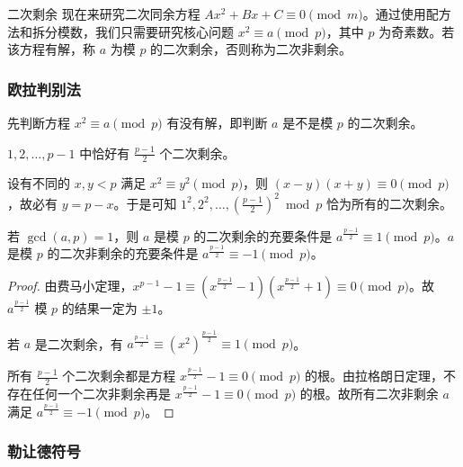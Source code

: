 \documentclass[../main.tex]{subfiles}
\begin{document}
\begin{frame}{二次剩余}
现在来研究二次同余方程 $Ax^2+Bx+C\equiv 0\pmod m$。通过使用配方法和拆分模数，我们只需要研究核心问题 $x^2\equiv a\pmod p$，其中 $p$ 为奇素数。若该方程有解，称 $a$ 为模 $p$ 的二次剩余，否则称为二次非剩余。
\end{frame}

\subsubsection{欧拉判别法}

\begin{frame}
先判断方程 $x^2\equiv a\pmod p$ 有没有解，即判断 $a$ 是不是模 $p$ 的二次剩余。 \pause

\begin{theo}
$1,2,\dots,p-1$ 中恰好有 $\frac{p-1}{2}$ 个二次剩余。
\end{theo} \pause

设有不同的 $x,y<p$ 满足 $x^2\equiv y^2\pmod p$，则 $(x-y)(x+y)\equiv 0\pmod p$，故必有 $y=p-x$。于是可知 $1^2,2^2,\dots,(\frac{p-1}{2})^2\bmod p$ 恰为所有的二次剩余。
\end{frame}

\begin{frame}
\begin{theo}[欧拉判别法]
若 $\gcd(a,p)=1$，则 $a$ 是模 $p$ 的二次剩余的充要条件是 $a^{\frac{p-1}{2}}\equiv 1\pmod p$。$a$ 是模 $p$ 的二次非剩余的充要条件是 $a^{\frac{p-1}{2}}\equiv -1\pmod p$。
\end{theo} \pause

\begin{proof}
由费马小定理，$x^{p-1}-1\equiv (x^{\frac{p-1}{2}}-1)(x^{\frac{p-1}{2}}+1)\equiv 0\pmod p$。故 $a^{\frac{p-1}{2}}$ 模 $p$ 的结果一定为 $\pm 1$。 \pause

若 $a$ 是二次剩余，有 $a^{\frac{p-1}{2}}\equiv (x^2)^{\frac{p-1}{2}}\equiv 1\pmod p$。 \pause

所有 $\frac{p-1}{2}$ 个二次剩余都是方程 $x^{\frac{p-1}{2}}-1\equiv 0\pmod p$ 的根。由拉格朗日定理，不存在任何一个二次非剩余再是 $x^{\frac{p-1}{2}}-1\equiv 0\pmod p$ 的根。故所有二次非剩余 $a$ 满足 $a^{\frac{p-1}{2}}\equiv -1\pmod p$。
\end{proof}
\end{frame}

\subsubsection{勒让德符号}
\end{document}
